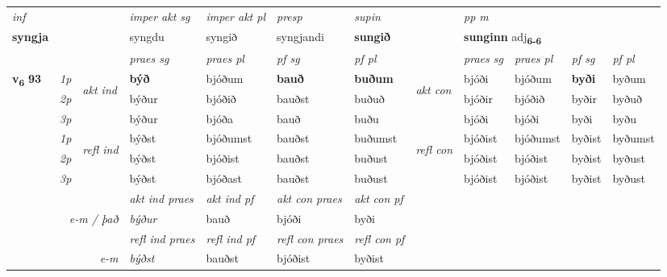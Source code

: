 \begin{longtable}[l]{X>{\footnotesize\itshape}llXXXXlXXXX}
   {\textit{inf}} & &  & \textit{imper akt sg} & \textit{imper akt pl}   & \textit{presp} & \textit{supin}  && \textit{pp m} \\*
  {\textbf{syngja}} & && syngdu  & syngið   & syngjandi &  \textbf{sungið}  && \multicolumn{2}{l}{\textbf{sunginn} adj\textbf{\textsubscript{6-6}}} \\*

\midrule

 & &   & \textit{praes sg}  & \textit{praes pl}    & \textit{ pf sg} & \textit{pf pl} & & \textit{praes sg}  & \textit{praes pl}    & \textit{pf sg} & \textit{pf pl }  \\ \cmidrule{4-7} \cmidrule{9-12}
 \multirow{2}{*}{{{\textbf{v{\textsubscript{6}}} \Large{\textbf{93}}}}}  & 1p & \multirow{3}{*}{\begin{turn}{90}\textit{akt ind}\end{turn}} & \textbf{býð} & bjóðum & \textbf{bauð} & \textbf{buðum} & \multirow{3}{*}{\begin{turn}{90}\textit{akt con}\end{turn}} &bjóði & bjóðum & \textbf{byði} & byðum\\*
 & 2p &  &  býður  & bjóðið & bauðst & buðuð & & bjóðir & bjóðið & byðir & byðuð \\*
 & 3p &  & býður & bjóða & bauð & buðu & & bjóði & bjóði& byði & byðu \\*
\cmidrule{4-7} \cmidrule{9-12}
 & 1p & \multirow{3}{*}{\begin{turn}{90}\textit{refl ind}\end{turn}}  & býðst & bjóðumst & bauðst & buðumst & \multirow{3}{*}{\begin{turn}{90}\textit{refl con}\end{turn}}  &bjóðist & bjóðumst & byðist & byðumst \\*
 & 2p &  & býðst & bjóðist & bauðst & buðust & &bjóðist & bjóðist & byðist & byðust \\*
 & 3p  & & býðst & bjóðast & bauðst & buðust & & bjóðist & bjóðist& byðist & byðust \\*
\cmidrule{4-7} \cmidrule{9-12}

   && &  \textit{akt ind praes} & \textit{akt ind pf} & \textit{akt con praes} & \textit{akt con pf} \\*
\multicolumn{3}{r}{\textit{e-m / það}} & býður & bauð & bjóði & byði \\*

\cmidrule{4-7}
 & && \textit{refl ind praes} & \textit{refl ind pf} & \textit{refl con praes} & \textit{refl con pf} \\*
\multicolumn{3}{r}{\textit{e-m}}& býðst & bauðst & bjóðist & byðist \\*


\end{longtable}
